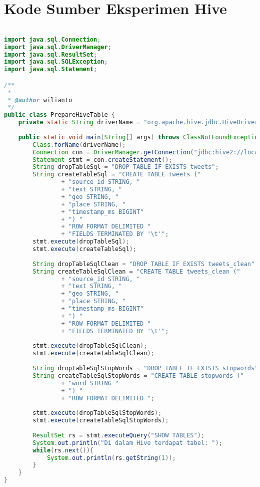 \chapter{Kode Sumber Eksperimen Hive}
\label{app:D}

\singlespacing 
%
%
\begin{lstlisting}[language=Java,basicstyle=\tiny,caption=PrepareHiveTable.java]

import java.sql.Connection;
import java.sql.DriverManager;
import java.sql.ResultSet;
import java.sql.SQLException;
import java.sql.Statement;

/**
 *
 * @author wilianto
 */
public class PrepareHiveTable {
    private static String driverName = "org.apache.hive.jdbc.HiveDriver";
        
    public static void main(String[] args) throws ClassNotFoundException, SQLException {
        Class.forName(driverName);
        Connection con = DriverManager.getConnection("jdbc:hive2://localhost:10000/default", "wilianto", "");
        Statement stmt = con.createStatement();
        String dropTableSql = "DROP TABLE IF EXISTS tweets";
        String createTableSql = "CREATE TABLE tweets ("
                + "source_id STRING, "
                + "text STRING, "
                + "geo STRING, "
                + "place STRING, "
                + "timestamp_ms BIGINT"
                + ") "
                + "ROW FORMAT DELIMITED "
                + "FIELDS TERMINATED BY '\t'";
        stmt.execute(dropTableSql);
        stmt.execute(createTableSql);
        
        String dropTableSqlClean = "DROP TABLE IF EXISTS tweets_clean";
        String createTableSqlClean = "CREATE TABLE tweets_clean ("
                + "source_id STRING, "
                + "text STRING, "
                + "geo STRING, "
                + "place STRING, "
                + "timestamp_ms BIGINT"
                + ") "
                + "ROW FORMAT DELIMITED "
                + "FIELDS TERMINATED BY '\t'";
        
        stmt.execute(dropTableSqlClean);
        stmt.execute(createTableSqlClean);
        
        String dropTableSqlStopWords = "DROP TABLE IF EXISTS stopwords";
        String createTableSqlStopWords = "CREATE TABLE stopwords ("
                + "word STRING "
                + ") "
                + "ROW FORMAT DELIMITED ";
        
        stmt.execute(dropTableSqlStopWords);
        stmt.execute(createTableSqlStopWords);
        
        ResultSet rs = stmt.executeQuery("SHOW TABLES");
        System.out.println("Di dalam Hive terdapat tabel: ");
        while(rs.next()){
            System.out.println(rs.getString(1));
        }
    }
}
\end{lstlisting}

